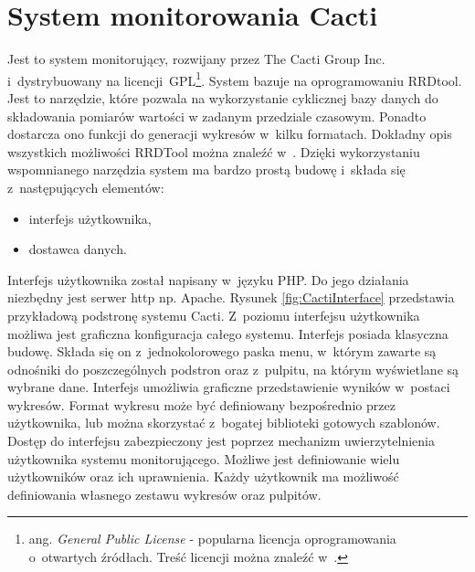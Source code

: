 \section[Cacti][System monitorowania Cacti]{System monitorowania Cacti}

Jest to system monitorujący, rozwijany przez The Cacti Group
Inc. i~dystrybuowany na licencji~GPL\footnote{ ang. {\em General
    Public License} - popularna licencja oprogramowania o~otwartych
  źródłach. Treść licencji można znaleźć w~\cite{www:GPLv2}.}. System
bazuje na oprogramowaniu RRDtool. Jest to narzędzie, które pozwala na
wykorzystanie cyklicznej bazy danych do składowania pomiarów wartości
w zadanym przedziale czasowym. Ponadto dostarcza ono funkcji do
generacji wykresów w~kilku formatach. Dokładny opis wszystkich
możliwości RRDTool można znaleźć w~\cite{www:RRDtool}. Dzięki
wykorzystaniu wspomnianego narzędzia system ma bardzo prostą budowę
i~składa się z~następujących elementów:

\begin{itemize}
\item interfejs użytkownika,
\item dostawca danych.
\end{itemize}

Interfejs użytkownika został napisany w~języku PHP. Do jego działania
niezbędny jest serwer http np. Apache. Rysunek
\ref{fig:CactiInterface} przedstawia przykładową podstronę systemu
Cacti. Z~poziomu interfejsu użytkownika możliwa jest graficzna
konfiguracja całego systemu. Interfejs posiada klasyczna
budowę. Składa się on z~jednokolorowego paska menu, w~którym zawarte
są odnośniki do poszczególnych podstron oraz z~pulpitu, na którym
wyświetlane są wybrane dane. Interfejs umożliwia graficzne
przedstawienie wyników w~postaci wykresów. Format wykresu może być
definiowany bezpośrednio przez użytkownika, lub można skorzystać
z~bogatej biblioteki gotowych szablonów. Dostęp do interfejsu
zabezpieczony jest poprzez mechanizm uwierzytelnienia użytkownika
systemu monitorującego. Możliwe jest definiowanie wielu użytkowników
oraz ich uprawnienia. Każdy użytkownik ma możliwość definiowania
własnego zestawu wykresów oraz pulpitów.

